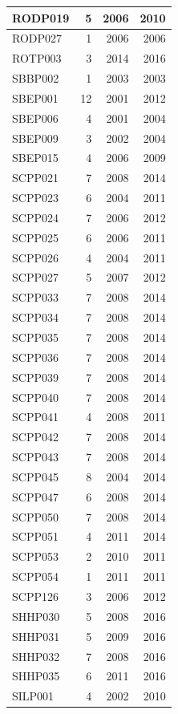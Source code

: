 \documentclass[11pt,]{book}
\begin{document}
\begin{table}
\begin{tabular}[t]{l|r|r|r}
\hline
RODP019 & 5 & 2006 & 2010\\
\hline
RODP027 & 1 & 2006 & 2006\\
\hline
ROTP003 & 3 & 2014 & 2016\\
\hline
SBBP002 & 1 & 2003 & 2003\\
\hline
SBEP001 & 12 & 2001 & 2012\\
\hline
SBEP006 & 4 & 2001 & 2004\\
\hline
SBEP009 & 3 & 2002 & 2004\\
\hline
SBEP015 & 4 & 2006 & 2009\\
\hline
SCPP021 & 7 & 2008 & 2014\\
\hline
SCPP023 & 6 & 2004 & 2011\\
\hline
SCPP024 & 7 & 2006 & 2012\\
\hline
SCPP025 & 6 & 2006 & 2011\\
\hline
SCPP026 & 4 & 2004 & 2011\\
\hline
SCPP027 & 5 & 2007 & 2012\\
\hline
SCPP033 & 7 & 2008 & 2014\\
\hline
SCPP034 & 7 & 2008 & 2014\\
\hline
SCPP035 & 7 & 2008 & 2014\\
\hline
SCPP036 & 7 & 2008 & 2014\\
\hline
SCPP039 & 7 & 2008 & 2014\\
\hline
SCPP040 & 7 & 2008 & 2014\\
\hline
SCPP041 & 4 & 2008 & 2011\\
\hline
SCPP042 & 7 & 2008 & 2014\\
\hline
SCPP043 & 7 & 2008 & 2014\\
\hline
SCPP045 & 8 & 2004 & 2014\\
\hline
SCPP047 & 6 & 2008 & 2014\\
\hline
SCPP050 & 7 & 2008 & 2014\\
\hline
SCPP051 & 4 & 2011 & 2014\\
\hline
SCPP053 & 2 & 2010 & 2011\\
\hline
SCPP054 & 1 & 2011 & 2011\\
\hline
SCPP126 & 3 & 2006 & 2012\\
\hline
SHHP030 & 5 & 2008 & 2016\\
\hline
SHHP031 & 5 & 2009 & 2016\\
\hline
SHHP032 & 7 & 2008 & 2016\\
\hline
SHHP035 & 6 & 2011 & 2016\\
\hline
SILP001 & 4 & 2002 & 2010\\

\end{tabular}
\end{table}
\end{document}
